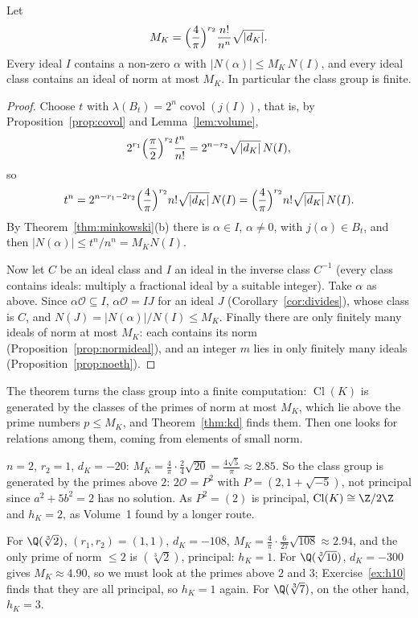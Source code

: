 \begin{theorem}\label{thm:minkbound}
Let
\[
M_K=\Bigl(\frac4\pi\Bigr)^{r_2}\frac{n!}{n^n}\sqrt{|d_K|}.
\]
Every ideal $I$ contains a non-zero $\alpha$ with $|N(\alpha)|\le M_K\,N(I)$, and every ideal class contains an ideal of
norm at most $M_K$. In particular the class group is finite.
\end{theorem}
\begin{proof}
Choose $t$ with $\lambda(B_t)=2^n\operatorname{covol}(j(I))$, that is, by Proposition~\ref{prop:covol} and
Lemma~\ref{lem:volume},
\[
2^{r_1}\Bigl(\frac\pi2\Bigr)^{r_2}\frac{t^n}{n!}=2^{n-r_2}\sqrt{|d_K|}\,N(I),
\]
so
\[
t^n=2^{n-r_1-2r_2}\Bigl(\frac4\pi\Bigr)^{r_2}n!\sqrt{|d_K|}\,N(I)=\Bigl(\frac4\pi\Bigr)^{r_2}n!\sqrt{|d_K|}\,N(I).
\]
By Theorem~\ref{thm:minkowski}(b) there is $\alpha\in I$, $\alpha\ne0$, with $j(\alpha)\in B_t$, and then $|N(\alpha)|
\le t^n/n^n=M_KN(I)$.

Now let $C$ be an ideal class and $I$ an ideal in the inverse class $C^{-1}$ (every class contains ideals: multiply a
fractional ideal by a suitable integer). Take $\alpha$ as above. Since $\alpha\mathcal O\subseteq I$, $\alpha\mathcal O=IJ$
for an ideal $J$ (Corollary~\ref{cor:divides}), whose class is $C$, and $N(J)=|N(\alpha)|/N(I)\le M_K$. Finally there are
only finitely many ideals of norm at most $M_K$: each contains its norm (Proposition~\ref{prop:normideal}), and an
integer $m$ lies in only finitely many ideals (Proposition~\ref{prop:noeth}).
\end{proof}

The theorem turns the class group into a finite computation: $\operatorname{Cl}(K)$ is generated by the classes of the
primes of norm at most $M_K$, which lie above the prime numbers $p\le M_K$, and Theorem~\ref{thm:kd} finds them. Then one
looks for relations among them, coming from elements of small norm.

\begin{example}[{$\Q(\sqrt{-5})$}]
$n=2$, $r_2=1$, $d_K=-20$: $M_K=\frac4\pi\cdot\frac24\sqrt{20}=\frac{4\sqrt5}\pi\approx2.85$. So the class group is
generated by the primes above $2$: $2\mathcal O=P^2$ with $P=(2,1+\sqrt{-5})$, not principal since $a^2+5b^2=2$ has no
solution. As $P^2=(2)$ is principal, $\operatorname{Cl}(K)\cong\Z/2\Z$ and $h_K=2$, as Volume~1 found by a longer route.
\end{example}

\begin{example}
For $\Q(\sqrt[3]2)$, $(r_1,r_2)=(1,1)$, $d_K=-108$, $M_K=\frac4\pi\cdot\frac6{27}\sqrt{108}\approx2.94$, and the only
prime of norm $\le2$ is $(\sqrt[3]2)$, principal: $h_K=1$. For $\Q(\sqrt[3]{10})$, $d_K=-300$ gives $M_K\approx4.90$, so we
must look at the primes above $2$ and $3$; Exercise~\ref{ex:h10} finds that they are all principal, so $h_K=1$ again.
For $\Q(\sqrt[3]7)$, on the other hand, $h_K=3$.
\end{example}

